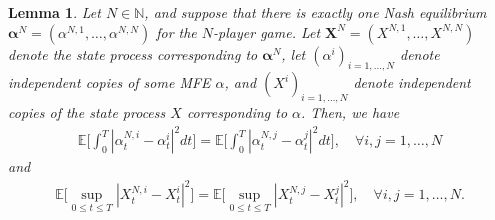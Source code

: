 \documentclass[11pt,reqno]{amsart}
\numberwithin{equation}{section}
\newtheorem{lemma}[theorem]{Lemma}
\theoremstyle{definition}
\def\E{{\mathbb E}}
\def\N{{\mathbb N}}
\newcommand{\bX}{\mathbf{X}}
\def \E{\mathbb{E}}
\def \N{\mathbb{N}}
\begin{document}
\begin{lemma} \label{lem:exchangeable}
  Let $N \in \N$, and suppose that there is exactly one Nash equilibrium $\bm{\alpha}^N = (\alpha^{N,1},\dots,\alpha^{N,N})$ for the $N$-player game. 
  Let $\bX^N = (X^{N,1},\dots,X^{N,N})$ denote the state process corresponding to $\bm \alpha^N$, let $(\alpha^i)_{i = 1,\dots,N}$ denote independent copies of some MFE $\alpha$, and $(X^i)_{i = 1,\dots,N}$ denote independent copies of the state process $X$ corresponding to $\alpha$.
  Then, we have 
\begin{align} \label{alphasymmetry}
    \E\bigg[\int_0^T |\alpha_t^{N,i} - \alpha_t^i|^2 dt \bigg] =  \E\bigg[\int_0^T |\alpha_t^{N,j} - \alpha_t^j|^2 dt \bigg], \quad \forall i,j = 1,\dots,N \end{align}
and 
\begin{align} \label{xsymmetry}
    \E\Big[\sup_{0 \leq t \leq T} |X_t^{N,i} - X_t^i|^2  \Big] =  \E\Big[\sup_{0 \leq t \leq T} |X_t^{N,j} - X_t^j|^2 \Big], \quad \forall i,j = 1,\dots,N.
\end{align}
\end{lemma}
\end{document}
